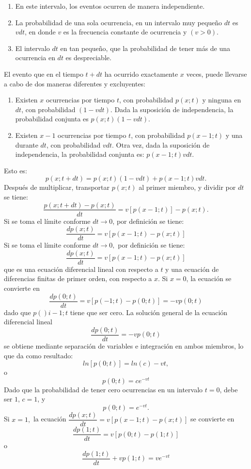 \begin{enumerate}[\bfseries 1.]
    \item En este intervalo, los eventos ocurren de manera independiente.
    \item La probabilidad de una sola ocurrencia, en un intervalo muy pequeño $dt$ es $vdt$, en donde $v$ es la frecuencia constante de ocurrencia y $(v>0)$.
    \item El intervalo $dt$ en tan pequeño, que la probabilidad de tener más de una ocurrencia en $dt$ es despreciable.
\end{enumerate}

El evento que en el tiempo $t+dt$ ha ocurrido exactamente $x$ veces, puede llevarse a cabo de dos maneras diferentes y excluyentes:

\begin{enumerate}[\bfseries 1.]
    \item Existen $x$ ocurrencias por tiempo $t$, con probabilidad $p(x;t)$ y ninguna en $dt$, con probabilidad $(1-vdt)$. Dada la suposición de independencia, la probabilidad conjunta es $p(x;t)(1-vdt)$.
    \item Existen $x-1$ ocurrencias por tiempo $t$, con probabilidad $p(x-1;t)$ y una durante $dt$, con probabilidad $vdt$. Otra vez, dada la suposición de independencia, la probabilidad conjunta es: $p(x-1;t)vdt.$ 
\end{enumerate}
Esto es:
$$p(x;t+dt)=p(x;t)(1-vdt)+p(x-1;t)vdt.$$
Después de multiplicar, transportar $p(x;t)$ al primer miembro, y dividir por $dt$ se tiene:
$$\dfrac{p(x;t+dt)-p(x;t)}{dt}=v[p(x-1;t)]-p(x;t).$$
Si se toma el límite conforme $dt\to 0$, por definición se tiene:
$$\dfrac{dp(x;t)}{dt}=v[p(x-1;t)-p(x;t)]$$
 Si se toma el límite conforme $dt\to 0,$ por definición se tiene:
 $$\dfrac{dp(x;t)}{dt}=v\left[p(x-1;t)-p(x;t)\right]$$
 que es una ecuación diferencial lineal con respecto a $t$ y una ecuación de diferencias finitas de primer orden, con respecto a $x$. Si $x=0$, la ecuación se convierte en 
 $$\dfrac{dp(0;t)}{dt}=v\left[p(-1;t)-p(0;t)\right] = -vp(0;t)$$
 dado que $p()i-1;t$ tiene que ser cero. La solución general de la ecuación diferencial lineal 
 $$\dfrac{dp(0;t)}{dt}=-vp(0;t)$$
 se obtiene mediante separación de variables e integración en ambos miembros, lo que da como resultado:
 $$ln\left[p(0;t)\right]=ln(c)-vt,$$
 o
 $$p(0;t)=ce^{-vt}$$
 Dado que la probabilidad de tener cero ocurrencias en un intervalo $t=0$, debe ser $1$, $c=1$, y
 $$p(0;t)=e^{-vt}.$$
 Si $x=1,$ la ecuación  $\dfrac{dp(x;t)}{dt}=v[p(x-1;t)-p(x;t)]$ se convierte en
$$\dfrac{dp(1;t)}{dt}=v[p(0;t)-p(1;t)]$$
o
$$\dfrac{dp(1;t)}{dt}+vp(1;t) = ve^{-vt}$$

